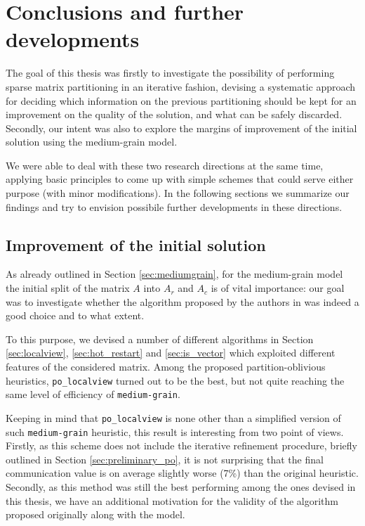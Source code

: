 \chapter{Conclusions and further developments} \label{chap:conclusions}

The goal of this thesis was firstly to investigate the possibility of performing sparse matrix partitioning in an iterative fashion, devising a systematic approach for deciding which information on the previous partitioning should be kept for an improvement on the quality of the solution, and what can be safely discarded. Secondly, our intent was also to explore the margins of improvement of the initial solution using the medium-grain model.

We were able to deal with these two research directions at the same time, applying basic principles to come up with simple schemes that could serve either purpose (with minor modifications). In the following sections we summarize our findings and try to envision possibile further developments in these directions.

\section{Improvement of the initial solution} \label{sec:conclusions_po}

As already outlined in Section \ref{sec:mediumgrain}, for the medium-grain model the initial split of the matrix $A$ into $A_r$ and $A_c$ is of vital importance: our goal was to investigate whether the algorithm proposed by the authors in \cite{mediumgrain} was indeed a good choice and to what extent.

To this purpose, we devised a number of different algorithms in Section \ref{sec:localview}, \ref{sec:hot_restart} and \ref{sec:is_vector} which exploited different features of the considered matrix. Among the proposed partition-oblivious heuristics, \verb|po_localview| turned out to be the best, but not quite reaching the same level of efficiency of \verb|medium-grain|.

Keeping in mind that \verb|po_localview| is none other than a simplified version of such \verb|medium-grain| heuristic, this result is interesting from two point of views. Firstly, as this scheme does not include the iterative refinement procedure, briefly outlined in Section \ref{sec:preliminary_po}, it is not surprising that the final communication value is on average slightly worse (7\%) than the original heuristic. Secondly, as this method was still the best performing among the ones devised in this thesis, we have an additional motivation for the validity of the algorithm proposed originally along with the model.

